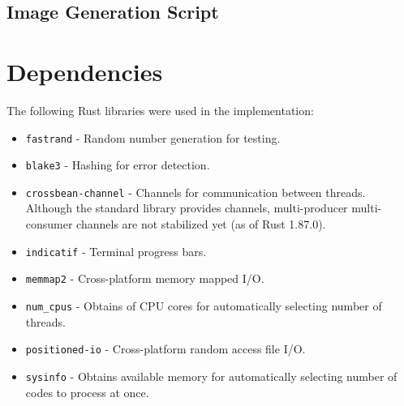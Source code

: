 \clearpage

\subsection{Image Generation Script}

\begin{tiny}

\end{tiny}

\clearpage

\section{Dependencies}

\label{appendix:dependencies}

The following Rust libraries were used in the implementation:

\begin{itemize}
    \item \texttt{fastrand} - Random number generation for testing.
    \item \texttt{blake3} - Hashing for error detection.
    \item \texttt{crossbean-channel} - Channels for communication between threads. Although the standard library provides channels, multi-producer multi-consumer channels are not stabilized yet (as of Rust 1.87.0).
    \item \texttt{indicatif} - Terminal progress bars.
    \item \texttt{memmap2} - Cross-platform memory mapped I/O.
    \item \texttt{num\_cpus} - Obtains of CPU cores for automatically selecting number of threads.
    \item \texttt{positioned-io} - Cross-platform random access file I/O.
    \item \texttt{sysinfo} - Obtains available memory for automatically selecting number of codes to process at once.
\end{itemize}
